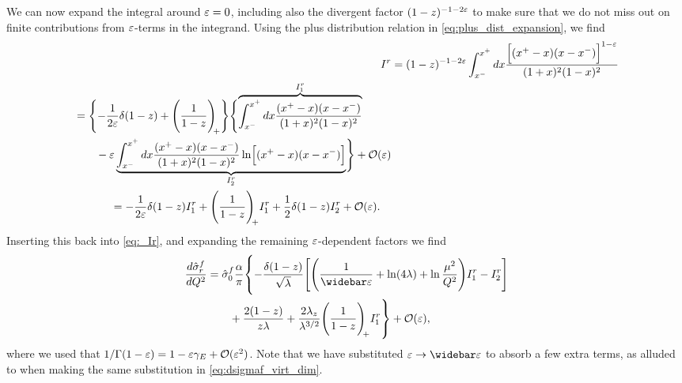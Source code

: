 We can now expand the integral around $\varepsilon=0$, including also the divergent factor $(1-z)^{-1-2\varepsilon}$ to make sure that we do not miss out on finite contributions from $\varepsilon$-terms in the integrand. Using the plus distribution relation in \cref{eq:plus_dist_expansion}, we find
\begin{align}
    I^r &= (1-z)^{-1-2\varepsilon} \int_{x^-}^{x^+} dx \frac{\Bigl[(x^+-x)(x-x^-)\Bigr]^{1-\varepsilon}}{(1+x)^2 (1-x)^2}
    \nonumber \\
    \begin{split}
        &= \Biggl\{ -\frac{1}{2\varepsilon}\delta(1-z) + \Biggl( \frac{1}{1-z} \Biggr)_{\!\!+} \Biggr\}
        \Biggl\{
            \overbrace{\int_{x^-}^{x^+} dx \frac{(x^+-x)(x-x^-)}{(1+x)^2(1-x)^2}}^{I^r_1}
            \\ &\qquad
            - \varepsilon \underbrace{\int_{x^-}^{x^+} dx \frac{(x^+-x)(x-x^-)}{(1+x)^2(1-x)^2} \ln\Bigl[ (x^+-x)(x-x^-) \Bigr]}_{I^r_2}
        \Biggr\} + \mathcal{O}(\varepsilon)
    \end{split}
    \nonumber \\
    \begin{split}
        &= -\frac{1}{2\varepsilon}\delta(1-z)I^r_1
        + \Biggl( \frac{1}{1-z} \Biggr)_{\!\!+} I^r_1
        + \frac{1}{2}\delta(1-z)I^r_2 + \mathcal{O}(\varepsilon).
    \end{split}
    \label{eq:Ir}
\end{align}
Inserting this back into \cref{eq:_Ir}, and expanding the remaining $\varepsilon$-dependent factors we find
\begin{equation}
\begin{split}
    \frac{d\hat\sigma^f_r}{dQ^2} &= \hat\sigma^f_0 \frac{\alpha}{\pi}
    \vastl\{
        - \frac{\delta(1-z)}{\sqrt{\lambda}} \Biggl[
            \Biggl(
                \frac{1}{\widebar\eps}
                + \ln(4\lambda)
                + \ln\frac{\mu^2}{Q^2}
            \Biggr) I^r_1
            - I^r_2
        \Biggr]
        \\ &\qquad
        + \frac{2(1-z)}{z\lambda}
        + \frac{2\lambda_z}{\lambda^{3/2}} \plusdist I^r_1
    \vastr\} + \mathcal{O}(\eps),
\end{split}
\label{eq:dsigmaf_Ir12}
\end{equation}
where we used that $1/\Gamma(1-\varepsilon)=1-\varepsilon\gamma_E+\mathcal{O}(\varepsilon^2)$.
Note that we have substituted $\eps \to \widebar\eps$ to absorb a few extra terms, as alluded to when making the same substitution in \cref{eq:dsigmaf_virt_dim}.

